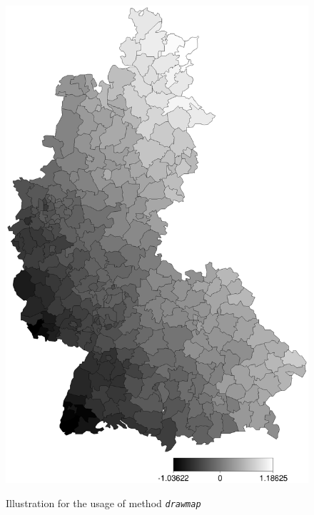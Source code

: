 \begin{figure}[ht]
\begin{center}
\includegraphics[scale=0.4]{grafiken/remlregdrawmapexample.ps}
{\em\caption{ \label{remlregdrawmapexample1} Illustration for the
usage of method \em\texttt{drawmap}}}
\end{center}
\end{figure}



